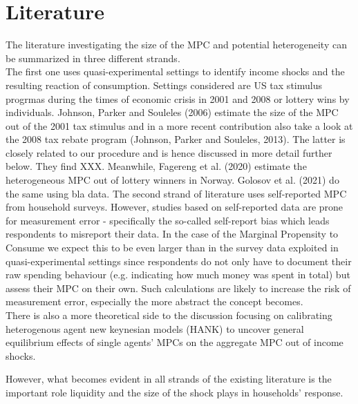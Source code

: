 \section{Literature}
The literature investigating the size of the MPC and potential heterogeneity can be summarized in three different strands. \\
The first one uses quasi-experimental settings to identify income shocks and the resulting reaction of consumption. Settings considered are US tax stimulus progrmas during the times of economic crisis in 2001 and 2008 or lottery wins by individuals. Johnson, Parker and Souleles (2006) estimate the size of the MPC out of the 2001 tax stimulus and in a more recent contribution also take a look at the 2008 tax rebate program (Johnson, Parker and Souleles, 2013). The latter is closely related to our procedure and is hence discussed in more detail further below. They find XXX. Meanwhile, Fagereng et al. (2020) estimate the heterogeneous MPC out of lottery winners in Norway. Golosov et al. (2021) do the same using bla data. 
The second strand of literature uses self-reported MPC from household surveys. 
However, studies based on self-reported data are prone for measurement error - specifically the so-called self-report bias which leads respondents to misreport their data. In the case of the Marginal Propensity to Consume we expect this to be even larger than in the survey data exploited in quasi-experimental settings since respondents do not only have to document their raw spending behaviour (e.g. indicating how much money was spent in total) but assess their MPC on their own. Such calculations are likely to increase the risk of measurement error, especially the more abstract the concept becomes. \\
There is also a more theoretical side to the discussion focusing on calibrating heterogenous agent new keynesian models (HANK) to uncover general equilibrium effects of single agents' MPCs on the aggregate MPC out of income shocks.

However, what becomes evident in all strands of the existing literature is the important role liquidity and the size of the shock plays in households' response. 

